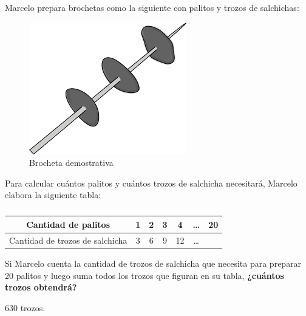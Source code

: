 Marcelo prepara brochetas como la siguiente con palitos y trozos de salchichas:

\begin{minipage}{0.4\linewidth}
    \begin{figure}[H]
        \centering
        \includegraphics[width=0.9\linewidth]{../images/8cc56669378bdf27d863fffcaffb0080db06805e}
        \caption{Brocheta demostrativa}
        \label{fig:8cc56669378bdf27d863fffcaffb0080db06805e}
    \end{figure}
\end{minipage}\hfill
\begin{minipage}{0.6\linewidth}
    Para calcular cuántos palitos y cuántos trozos de salchicha necesitará, Marcelo elabora la siguiente tabla:

    \begin{table}[H]
        \centering
        \caption{}
        \label{tab:estampillas}
        \begin{tabular}{c|c|c|c|c|c|c}
            Cantidad de palitos             & 1 & 2 & 3 & 4  & \dots & 20 \\ \hline
            Cantidad de trozos de salchicha & 3 & 6 & 9 & 12 & \dots &    \\
        \end{tabular}
    \end{table}


    Si Marcelo cuenta la cantidad de trozos de salchicha que necesita para preparar
    20 palitos y luego suma todos los trozos que figuran en su tabla,
    \textbf{¿cuántos trozos obtendrá?}

    \begin{solutionbox}{1.2cm}
        630 trozos.
    \end{solutionbox}

\end{minipage}